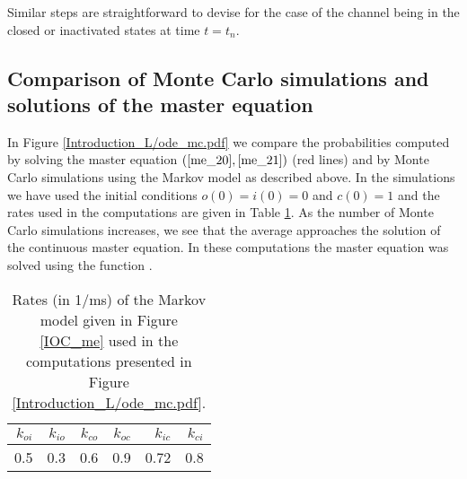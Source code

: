 Similar steps are straightforward to
devise for the case of the channel being in the closed or inactivated states
at time $t=t_{n}.$ 


\subsection[Monte Carlo simulation vs Master Equation]{Comparison of Monte Carlo simulations and solutions of the
master equation}

In Figure \ref{Introduction_L/ode_mc.pdf} we compare the probabilities computed by solving the master equation $\left( \ref{me_20},\ref{me_21}\right)  $ (red lines) and by Monte Carlo simulations using the Markov model as described above. In the simulations we have used the initial conditions $o(0)=i(0)=0$
and $c(0)=1$ and the rates used in the computations are given in Table \ref{tab:const3x3}. As the number of Monte Carlo simulations increases, we see that the average approaches the solution of the continuous master equation. In these computations the master equation was solved using the function .


\begin{table}  \begin{center}                            
\begin{tabular}{|r|r|r|r|r|r|} \hline                    
$k_{oi}$ & $k_{io}$ & $k_{co}$ & $k_{oc}$ & $k_{ic}$ &$k_{ci}$  \\ \hline    
0.5  &    0.3 &   0.6   &  0.9  &   0.72  & 0.8 \\ \hline    
\end{tabular} \end{center}                               
\caption{Rates (in 1/ms) of the Markov model given in Figure  \ref{IOC_me} used in the computations presented in Figure \ref{Introduction_L/ode_mc.pdf}.}
 \label{tab:const3x3}  \end{table}                                              





